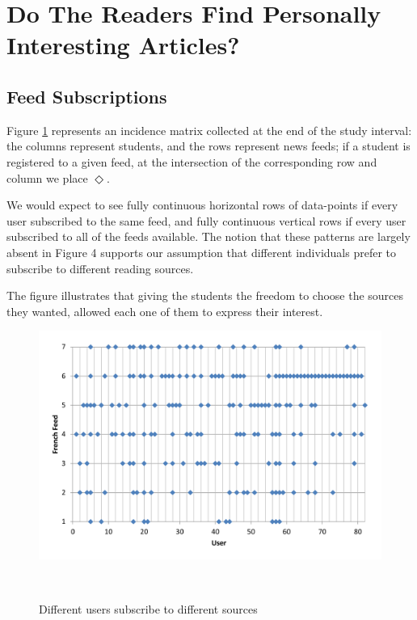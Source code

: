 
\newpage
\section{Do The Readers Find Personally Interesting Articles?}
\label{sec:results}

\subsection {Feed Subscriptions}
Figure \ref{fig:registrations} represents an incidence matrix collected at the end of the study interval: the columns represent students, and the rows represent news feeds; if a student is registered to a given feed, at the intersection of the corresponding row and column we place $\Diamond$. 

We would expect to see fully continuous horizontal rows of data-points if every user subscribed to the same feed, and fully continuous vertical rows if every user subscribed to all of the feeds available. The notion that these patterns are largely absent in Figure 4 supports our assumption that different individuals prefer to subscribe to different reading sources.

The figure illustrates that giving the students the freedom to choose the sources they wanted, allowed each one of them to express their interest. 

\begin{figure}[h!]
\centering
  \includegraphics[width=\columnwidth]{figures/users_feeds}
  \caption{Different users subscribe to different sources}~\label{fig:registrations}
\end{figure}

